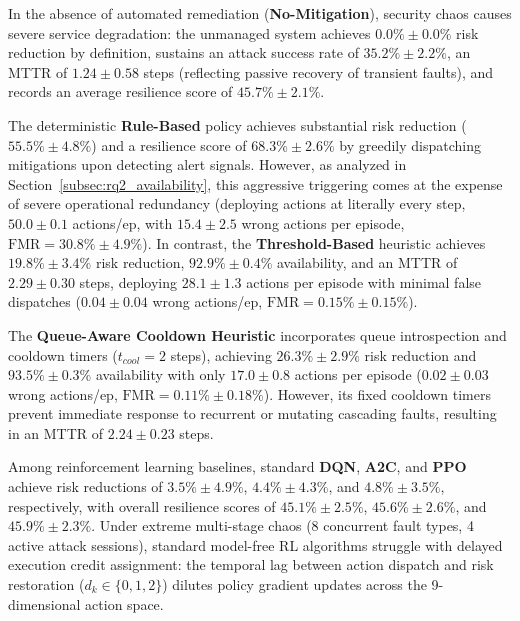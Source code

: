 \documentclass[11pt,a4paper]{article}
\begin{document}
In the absence of automated remediation (\textbf{No-Mitigation}), security chaos causes severe service degradation: the unmanaged system achieves $0.0\% \pm 0.0\%$ risk reduction by definition, sustains an attack success rate of $35.2\% \pm 2.2\%$, an MTTR of $1.24 \pm 0.58$ steps (reflecting passive recovery of transient faults), and records an average resilience score of $45.7\% \pm 2.1\%$.

The deterministic \textbf{Rule-Based} policy achieves substantial risk reduction ($55.5\% \pm 4.8\%$) and a resilience score of $68.3\% \pm 2.6\%$ by greedily dispatching mitigations upon detecting alert signals. However, as analyzed in Section~\ref{subsec:rq2_availability}, this aggressive triggering comes at the expense of severe operational redundancy (deploying actions at literally every step, $50.0 \pm 0.1$ actions/ep, with $15.4 \pm 2.5$ wrong actions per episode, $\text{FMR} = 30.8\% \pm 4.9\%$). In contrast, the \textbf{Threshold-Based} heuristic achieves $19.8\% \pm 3.4\%$ risk reduction, $92.9\% \pm 0.4\%$ availability, and an MTTR of $2.29 \pm 0.30$ steps, deploying $28.1 \pm 1.3$ actions per episode with minimal false dispatches ($0.04 \pm 0.04$ wrong actions/ep, $\text{FMR} = 0.15\% \pm 0.15\%$).

The \textbf{Queue-Aware Cooldown Heuristic} incorporates queue introspection and cooldown timers ($t_{cool}=2$ steps), achieving $26.3\% \pm 2.9\%$ risk reduction and $93.5\% \pm 0.3\%$ availability with only $17.0 \pm 0.8$ actions per episode ($0.02 \pm 0.03$ wrong actions/ep, $\text{FMR} = 0.11\% \pm 0.18\%$). However, its fixed cooldown timers prevent immediate response to recurrent or mutating cascading faults, resulting in an MTTR of $2.24 \pm 0.23$ steps.

Among reinforcement learning baselines, standard \textbf{DQN}, \textbf{A2C}, and \textbf{PPO} achieve risk reductions of $3.5\% \pm 4.9\%$, $4.4\% \pm 4.3\%$, and $4.8\% \pm 3.5\%$, respectively, with overall resilience scores of $45.1\% \pm 2.5\%$, $45.6\% \pm 2.6\%$, and $45.9\% \pm 2.3\%$. Under extreme multi-stage chaos (8 concurrent fault types, 4 active attack sessions), standard model-free RL algorithms struggle with delayed execution credit assignment: the temporal lag between action dispatch and risk restoration ($d_k \in \{0, 1, 2\}$) dilutes policy gradient updates across the 9-dimensional action space.
\end{document}
